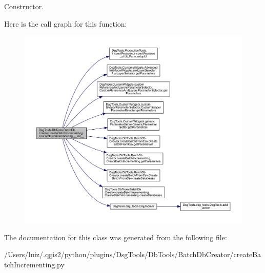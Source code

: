 \begin{DoxyVerb}Constructor.\end{DoxyVerb}
 Here is the call graph for this function\+:
\nopagebreak
\begin{figure}[H]
\begin{center}
\leavevmode
\includegraphics[width=350pt]{class_dsg_tools_1_1_db_tools_1_1_batch_db_creator_1_1create_batch_incrementing_1_1_create_batch_incrementing_a648890817156882b08f81b079122c524_cgraph}
\end{center}
\end{figure}


The documentation for this class was generated from the following file\+:\begin{DoxyCompactItemize}
\item 
/\+Users/luiz/.\+qgis2/python/plugins/\+Dsg\+Tools/\+Db\+Tools/\+Batch\+Db\+Creator/create\+Batch\+Incrementing.\+py\end{DoxyCompactItemize}
